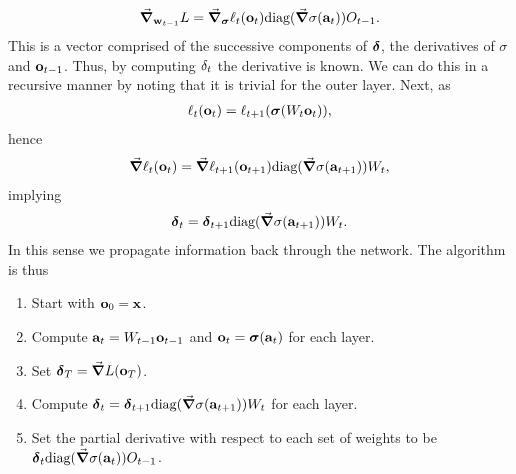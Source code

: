 \begin{align*}
	\grad_{\vb{w}_{t - 1}}L = \grad_{\vb*{\sigma}}\ell_{t}(\vb{o}_{t})\text{diag}(\grad\sigma(\vb{a}_{t}))O_{t - 1}.
\end{align*}
This is a vector comprised of the successive components of $\vb*{\delta}$, the derivatives of $\sigma$ and $\vb{o}_{t - 1}$. Thus, by computing $\vb{\delta}_{t}$ the derivative is known. We can do this in a recursive manner by noting that it is trivial for the outer layer. Next, as
\begin{align*}
	\ell_{t}(\vb{o}_{t}) = \ell_{t + 1}(\vb*{\sigma}(W_{t}\vb{o}_{t})),
\end{align*}
hence
\begin{align*}
	\grad\ell_{t}(\vb{o}_{t}) = \grad\ell_{t + 1}(\vb{o}_{t + 1})\text{diag}(\grad\sigma(\vb{a}_{t + 1}))W_{t},
\end{align*}
implying
\begin{align*}
	\vb*{\delta}_{t} = \vb*{\delta}_{t + 1}\text{diag}(\grad\sigma(\vb{a}_{t + 1}))W_{t}.
\end{align*}
In this sense we propagate information back through the network. The algorithm is thus
\begin{enumerate}
	\item Start with $\vb{o}_{0} = \vb{x}$.
	\item Compute $\vb{a}_{t} = W_{t - 1}\vb{o}_{t - 1}$ and $\vb{o}_{t} = \vb*{\sigma}(\vb{a}_{t})$ for each layer.
	\item Set $\vb*{\delta}_{T} = \grad{L}(\vb{o}_{T})$.
	\item Compute $\vb*{\delta}_{t} = \vb*{\delta}_{t + 1}\text{diag}(\grad\sigma(\vb{a}_{t + 1}))W_{t}$ for each layer.
	\item Set the partial derivative with respect to each set of weights to be $\vb*{\delta}_{t}\text{diag}(\grad\sigma(\vb{a}_{t}))O_{t - 1}$.
\end{enumerate}